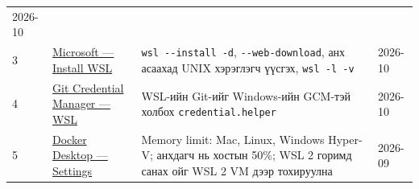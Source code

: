\begin{longtable}[]{@{}llll@{}}
\begin{minipage}[t]{0.22\columnwidth}
2026-10\strut
\end{minipage}\tabularnewline
\begin{minipage}[t]{0.22\columnwidth}\raggedright
3\strut
\end{minipage} & \begin{minipage}[t]{0.22\columnwidth}\raggedright
\href{https://learn.microsoft.com/en-us/windows/wsl/install}{Microsoft --- Install WSL}\strut
\end{minipage} & \begin{minipage}[t]{0.22\columnwidth}\raggedright
\texttt{wsl\ -\/\allowbreak{}-install\ -d}, \texttt{-\/-web-download}, анх асаахад UNIX хэрэглэгч үүсгэх, \texttt{wsl\ -l\ -v}\strut
\end{minipage} & \begin{minipage}[t]{0.22\columnwidth}\raggedright
2026-10\strut
\end{minipage}\tabularnewline
\begin{minipage}[t]{0.22\columnwidth}\raggedright
4\strut
\end{minipage} & \begin{minipage}[t]{0.22\columnwidth}\raggedright
\href{https://github.com/git-ecosystem/git-credential-manager/blob/main/docs/wsl.md}{Git Credential Manager --- WSL}\strut
\end{minipage} & \begin{minipage}[t]{0.22\columnwidth}\raggedright
WSL-ийн Git-ийг Windows-ийн GCM-тэй холбох \texttt{credential.\allowbreak{}helper}\strut
\end{minipage} & \begin{minipage}[t]{0.22\columnwidth}\raggedright
2026-10\strut
\end{minipage}\tabularnewline
\begin{minipage}[t]{0.22\columnwidth}\raggedright
5\strut
\end{minipage} & \begin{minipage}[t]{0.22\columnwidth}\raggedright
\href{https://docs.docker.com/desktop/settings-and-maintenance/settings/}{Docker Desktop --- Settings}\strut
\end{minipage} & \begin{minipage}[t]{0.22\columnwidth}\raggedright
Memory limit: Mac, Linux, Windows Hyper-V; анхдагч нь хостын 50\%; WSL 2 горимд санах ойг WSL 2 VM дээр тохируулна\strut
\end{minipage} & \begin{minipage}[t]{0.22\columnwidth}\raggedright
2026-09\strut
\end{minipage}\tabularnewline

\end{longtable}
